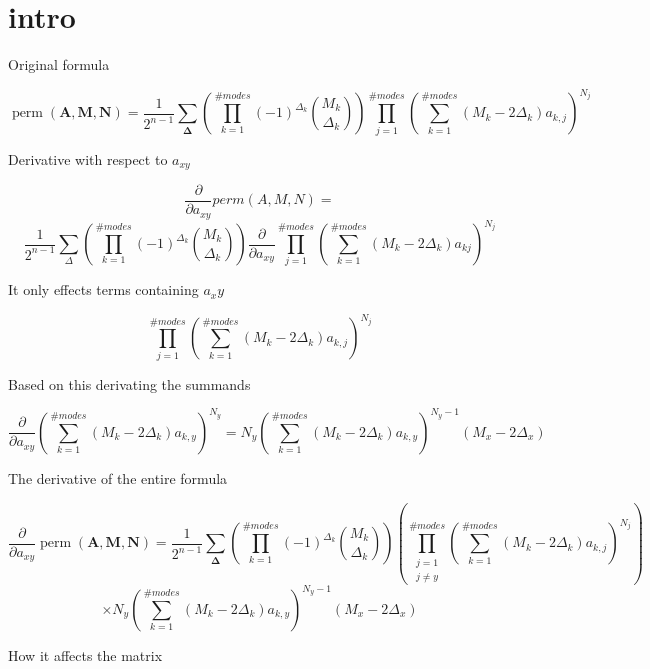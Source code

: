 \documentclass[a4paper]{article}
\theoremstyle{definition}
\begin{document}
\section{intro}

Original formula

\[
  \operatorname{perm}(\boldsymbol{A}, \boldsymbol{M}, \boldsymbol{N}) = \frac{1}{2^{n-1}} \sum_{\boldsymbol{\Delta}} \left( \prod_{k=1}^{\#modes } (-1)^{\Delta_{k}} \binom{M_{k}}{\Delta_{k}} \right) \prod_{j=1}^{\# modes } \left( \sum_{k=1}^{\# modes} \left( M_{k} - 2 \Delta_{k} \right) a_{k, j} \right)^{N_{j}}
\]

Derivative with respect to $a_{xy}$

\[
  \frac{\partial}{\partial a_{xy}}perm(A, M, N) =
\]
\[
  \frac{1}{2^{n-1}}\sum_{\Delta}\left(\prod_{k=1}^{\#modes}(-1)^{\Delta_{k}}\binom{M_{k}}{\Delta_{k}}\right)\frac{\partial}{\partial a_{xy}}\prod_{j=1}^{\#modes}\left(\sum_{k=1}^{\#modes}(M_{k}-2\Delta_{k})a_{kj}\right)^{N_{j}}
\]

It only effects terms containing $a_xy$

\[
  \prod_{j=1}^{\#modes}\left(\sum_{k=1}^{\#modes}\left(M_{k}-2 \Delta_{k}\right) a_{k, j}\right)^{N_{j}}
\]

Based on this derivating the summands

\[
  \frac{\partial}{\partial a_{xy}} \left( \sum_{k=1}^{\#modes } \left( M_{k} - 2 \Delta_{k} \right) a_{k, y} \right)^{N_{y}} = N_{y} \left( \sum_{k=1}^{\#modes} \left( M_{k} - 2 \Delta_{k} \right) a_{k, y} \right)^{N_{y} - 1} (M_{x} - 2 \Delta_{x})
\]

The derivative of the entire formula

\[
  \frac{\partial}{\partial a_{xy}} \operatorname{perm}(\boldsymbol{A}, \boldsymbol{M}, \boldsymbol{N}) = \frac{1}{2^{n-1}} \sum_{\boldsymbol{\Delta}} \left( \prod_{k=1}^{\# { modes }} (-1)^{\Delta_{k}} \binom{M_{k}}{\Delta_{k}} \right) \left( \prod_{\substack{j=1 \\ j \neq y}}^{\# { modes }} \left( \sum_{k=1}^{\# { modes }} \left( M_{k} - 2 \Delta_{k} \right) a_{k, j} \right)^{N_{j}} \right)
\]
\[
  \times N_{y} \left( \sum_{k=1}^{\# { modes }} \left( M_{k} - 2 \Delta_{k} \right) a_{k, y} \right)^{N_{y} - 1} (M_{x} - 2 \Delta_{x})
\]

How it affects the matrix
\end{document}
